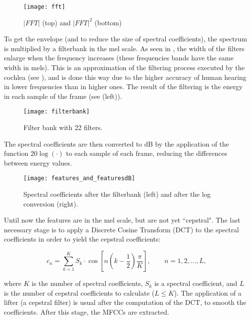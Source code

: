 \begin{figure}[ht]
    \centering
    \texttt{[image: fft]}
    \caption{$|FFT|$ (top) and $|FFT|^2$ (bottom)}
    \label{fig:fft}
\end{figure}


To get the envelope (and to reduce the size of spectral coefficients), the spectrum is multiplied by a filterbank in the mel scale. As seen in , the width of the filters enlarge when the frequency increases (these frequencies bands have the same width in mels). This is an approximation of the filtering process executed by the cochlea (see ), and is done this way due to the higher accuracy of human hearing in lower frequencies than in higher ones. The result of the filtering is the energy in each sample of the frame (see  (left)).

\begin{figure}[ht]
    \centering
    \texttt{[image: filterbank]}
    \caption{Filter bank with 22 filters.}
    \label{fig:filterbank}
\end{figure}


The spectral coefficients are then converted to dB by the application of the function $20\log(\cdot)$ to each sample of each frame, reducing the differences between energy values.

\begin{figure}[ht]
    \centering
    \texttt{[image: features\_and\_featuresdB]}
    \caption{Spectral coefficients after the filterbank (left) and after the log conversion (right).}
    \label{fig:features_and_featuresdB}
\end{figure}


Until now the features are in the mel scale, but are not yet ``cepstral". The last necessary stage is to apply a Discrete Cosine Transform (DCT) to the spectral coefficients in order to yield the cepstral coefficients:

\begin{equation}
    c_n = \sum_{k=1}^K S_k\cdot\cos\left[n\left(k - \frac{1}{2}\right)\frac{\pi}{K}\right],\qquad n = 1, 2, ..., L,
    \label{eq:dct}
\end{equation}

\noindent where $K$ is the number of spectral coefficients, $S_k$ is a spectral coefficient, and $L$ is the number of cepstral coefficients to calculate ($L \leq K$). The application of a lifter (a cepstral filter) is usual after the computation of the DCT, to smooth the coefficients. After this stage, the MFCCs are extracted.

